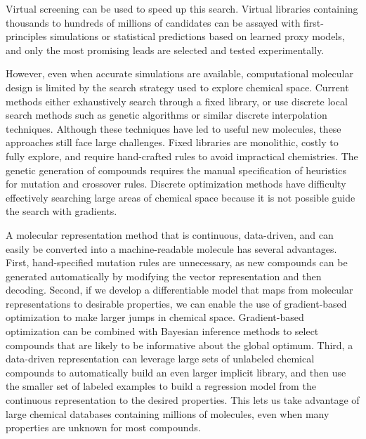 \documentclass[journal=acscii,manuscript=article]{achemso}
\begin{document}
Virtual screening can be used to speed up this search.\cite{shoichet_2004_virtual,scior2012,cheng2012,Pyzer_Knapp_2015} Virtual libraries containing thousands to hundreds of millions of candidates can be assayed with first-principles simulations or statistical predictions based on learned proxy models, and only the most promising leads are selected and tested experimentally.

However, even when accurate simulations are available,\cite{schneider_2010_virtual} computational molecular design is limited by the search strategy used to explore chemical space.
Current methods either exhaustively search through a fixed library,\cite{hachmann2011harvard,bombarelli2016} or use discrete local search methods such as genetic algorithms\cite{Virshup_2013, Rupakheti_2015, Reymond_2015, Reymond_2010,kanal_2013_efficient,oboyle_2011_computational} or similar discrete interpolation techniques.\cite{van_Deursen_2007,wang2006designing,balamurugan2008exploring}
Although these techniques have led to useful new molecules, these approaches still face large challenges. Fixed libraries are monolithic, costly to fully explore, and require hand-crafted rules to avoid impractical chemistries. The genetic generation of compounds requires the manual specification of heuristics for mutation and crossover rules. Discrete optimization methods have difficulty effectively searching large areas of chemical space because it is not possible  guide the search with gradients. 

A molecular representation method that is continuous, data-driven, and can easily be converted into a machine-readable molecule has several advantages. 
First, hand-specified mutation rules are unnecessary, as new compounds can be generated automatically by modifying the vector representation and then decoding.
Second, if we develop a differentiable model that maps from molecular representations to desirable properties, we can enable the use of gradient-based optimization to make larger jumps in chemical space. 
Gradient-based optimization can be combined with Bayesian inference methods to select compounds that are likely to be informative about the global optimum.
Third, a data-driven representation can leverage large sets of unlabeled chemical compounds to automatically build an even larger implicit library, and then use the smaller set of labeled examples to build a regression model from the continuous representation to the desired properties.
This lets us take advantage of large chemical databases containing millions of molecules, even when many properties are unknown for most compounds.
\end{document}
